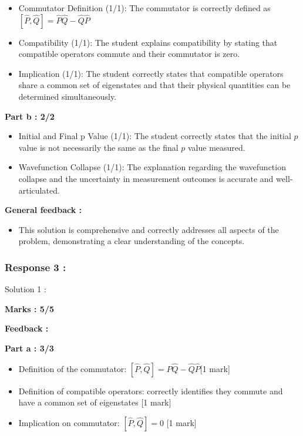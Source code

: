\documentclass[a4paper,11pt]{article}
\begin{document}
\begin{itemize}
    \item Commutator Definition (1/1): The commutator is correctly defined as $[\hat{P},\hat{Q}] = \hat{P}\hat{Q} - \hat{Q}\hat{P}$
    \item Compatibility (1/1): The student explains compatibility by stating that compatible operators commute and their commutator is zero.
    \item Implication (1/1): The student correctly states that compatible operators share a common set of eigenstates and that their physical quantities can be determined simultaneously.
\end{itemize}

\textbf{Part b : 2/2}

\begin{itemize}
    \item Initial and Final p Value (1/1): The student correctly states that the initial $p$ value is not necessarily the same as the final $p$ value measured.
    \item Wavefunction Collapse (1/1): The explanation regarding the wavefunction collapse and the uncertainty in measurement outcomes is accurate and well-articulated.
\end{itemize}

\textbf{General feedback :}

\begin{itemize}
    \item This solution is comprehensive and correctly addresses all aspects of the problem, demonstrating a clear understanding of the concepts.
\end{itemize}



\subsubsection*{Response 3 :} 

Solution 1 :

\textbf{Marks : 5/5}

\textbf{Feedback : }

\textbf{Part a : 3/3}

\begin{itemize}
    \item Definition of the commutator: $[\hat{P},\hat{Q}] = \hat{P}\hat{Q} - \hat{Q}\hat{P}$[1 mark]
    \item Definition of compatible operators: correctly identifies they commute and have a common set of eigenstates [1 mark]
    \item Implication on commutator: $[\hat{P},\hat{Q}] = 0$ [1 mark]
\end{itemize}
\end{document}
